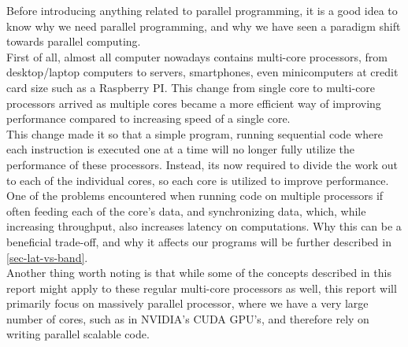 Before introducing anything related to parallel programming, it is a good idea to know why we need parallel programming, and why we have seen a paradigm shift towards parallel computing.\\
First of all, almost all computer nowadays contains multi-core processors, from desktop/laptop computers to servers, smartphones, even minicomputers at credit card size such as a Raspberry PI. This change from single core to multi-core processors arrived as multiple cores became a more efficient way of improving performance compared to increasing speed of a single core.\\
This change made it so that a simple program, running sequential code where each instruction is executed one at a time will no longer fully utilize the performance of these processors. Instead, its now required to divide the work out to each of the individual cores, so each core is utilized to improve performance. One of the problems encountered when running code on multiple processors if often feeding each of the core's data, and synchronizing data, which, while increasing throughput, also increases latency on computations. Why this can be a beneficial trade-off, and why it affects our programs will be further described in \cref{sec-lat-vs-band}.\\
Another thing worth noting is that while some of the concepts described in this report might apply to these regular multi-core processors as well, this report will primarily focus on massively parallel processor, where we have a very large number of cores, such as in NVIDIA's CUDA GPU's, and therefore rely on writing parallel scalable code.